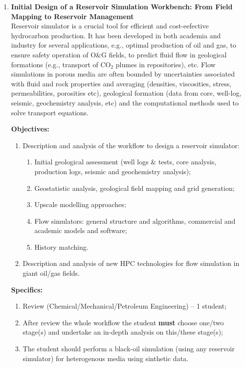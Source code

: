 \documentclass[12pts,a4paper,amsmath,amssymb,floatfix]{article}%
\begin{document}

\begin{enumerate}[label=\bfseries Project \arabic*:]

\item {\bf Initial Design of a Reservoir Simulation Workbench: From Field Mapping to Reservoir Management}\\
Reservoir simulator is a crucial tool for efficient and cost-eefective hydrocarbon production. It has been developed in both academia and industry for several applications, e.g., optimal production of oil and gas, to ensure safety operation of O$\&$G fields, to predict fluid flow in geological formations (e.g., transport of CO$_{2}$ plumes in repositories), etc. Flow simulations in porous media are often bounded by uncertainties associated with fluid and rock properties and averaging (densities, viscosities, stress, permeabilities, porosities etc), geological formation (data from core, well-log, seismic, geochemistry analysis, etc) and the computational methods used to solve transport equations. 

\noindent
{\bf Objectives:}
\begin{enumerate}
\item Description and analysis of the workflow to design a reservoir simulator:
\begin{enumerate}
\item Initial geological assessment (well logs $\&$ tests, core analysis, production logs, seismic and geochemistry analysis);
\item Geostatistic analysis, geological field mapping and grid generation;
\item Upscale modelling approaches;
\item Flow simulators: general structure and algorithms, commercial and academic models and software;
\item History matching.
\end{enumerate}
\item Description and analysis of new HPC technologies for flow simulation in giant oil/gas fields.
\end{enumerate}

\noindent
{\bf Specifics:} 
\begin{enumerate}
\item Review (Chemical/Mechanical/Petroleum Engineering) -- 1 student;
\item After review the whole workflow the student {\bf must} choose one/two stage(s) and undertake an in-depth analysis on this/these stage(s);
\item The student should perform a black-oil simulation (using any reservoir simulator) for heterogenous media using sinthetic data.
\end{enumerate}


\end{enumerate}
\end{document}
